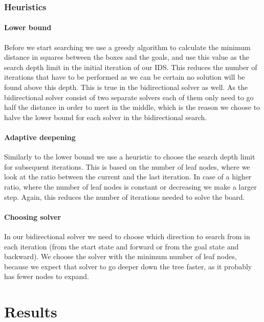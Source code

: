 \documentclass[a4paper,11pt]{article}
\renewcommand{\*}[0]{\cdot}
\begin{document}


\section{Heuristics}

\subsection{Lower bound}

Before we start searching we use a greedy algorithm to calculate the minimum
distance in squares between the boxes and the goals, and use this value as the
search depth limit in the initial iteration of our IDS. This reduces the number
of iterations that have to be performed as we can be certain no solution will be
found above this depth. This is true in the bidirectional solver as well. As the
bidirectional solver consist of two separate solvers each of them only need to
go half the distance in order to meet in the middle, which is the reason we
choose to halve the lower bound for each solver in the bidirectional search.

\subsection{Adaptive deepening}

Similarly to the lower bound we use a heuristic to choose the search depth limit
for subsequent iterations. This is based on the number of leaf nodes, where we
look at the ratio between the current and the last iteration. In case of a
higher ratio, where the number of leaf nodes is constant or decreasing we make a
larger step. Again, this reduces the number of iterations needed to solve the
board.

\subsection{Choosing solver}

In our bidirectional solver we need to choose which direction to search from in
each iteration (from the start state and forward or from the goal state and
backward). We choose the solver with the minimum number of leaf nodes, because
we expect that solver to go deeper down the tree faster, as it probably has
fewer nodes to expand.

\part*{Results}
\end{document}
